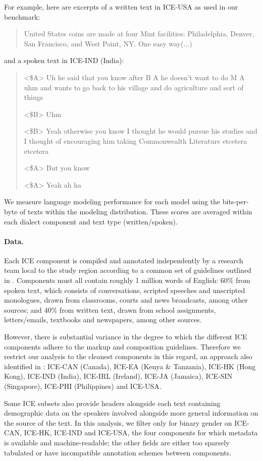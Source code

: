 For example, here are excerpts of a written text in ICE-USA as used in our benchmark: 
\begin{quote}
United States coins are made at four Mint facilities: Philadelphia, Denver, San Francisco, and West Point, NY. One easy way(...)
\end{quote}
and a spoken text in ICE-IND (India):
\begin{quote}
<\$A>
Uh he said that you know after B A he doesn't want to do M A
uhm and wants to go back to his village and do
agriculture and sort of things

<\$B>
Uhm

<\$B>
Yeah otherwise you know I thought he would
pursue his studies and I thought of encouraging him taking
Commonwealth Literature etcetera etcetera

<\$A>
But you know

<\$A>
Yeah ah ha
\end{quote}

We measure language modeling performance for each model using the bits-per-byte of texts within the modeling distribution. These scores are averaged within each dialect component and text type (written/spoken).

\paragraph{Data.}
Each ICE component is compiled and annotated independently by a research team local to the study region according to a common set of guidelines outlined in \citet{greenbaum1996international}. Components must all contain roughly 1 million words of English: 60\% from spoken text, which consists of conversations, scripted speeches and unscripted monologues, drawn from classrooms, courts and news broadcasts, among other sources; and 40\% from written text, drawn from school assignments, letters/emails, textbooks and newspapers, among other sources. 

However, there is substantial variance in the degree to which the different ICE components adhere to the markup and composition guidelines. Therefore we restrict our analysis to the cleanest components in this regard, an approach also identified in \citet{Szmrecsanyi2019-go}: ICE-CAN (Canada), ICE-EA (Kenya \& Tanzania), ICE-HK (Hong Kong), ICE-IND (India), ICE-IRL (Ireland), ICE-JA (Jamaica), ICE-SIN (Singapore), ICE-PHI (Philippines) and ICE-USA. 

Some ICE subsets also provide headers alongside each text containing demographic data on the speakers involved alongside more general information on the source of the text. In this analysis, we filter only for binary gender on ICE-CAN, ICE-HK, ICE-IND and ICE-USA, the four components for which metadata is available and machine-readable; the other fields are either too sparsely tabulated or have incompatible annotation schemes between components.

